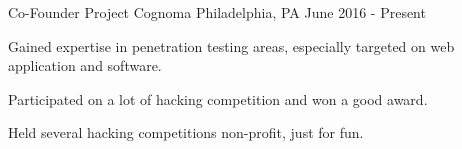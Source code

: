 

\begin{cventries}

  \cventry
    {Co-Founder} %
    {Project Cognoma} %
    {Philadelphia, PA} %
    {June 2016 - Present} %
    {
      \begin{cvitems} %
        \item {Gained expertise in penetration testing areas, especially targeted on web application and software.}
        \item {Participated on a lot of hacking competition and won a good award.}
        \item {Held several hacking competitions non-profit, just for fun.}
      \end{cvitems}
    }
\end{cventries}

